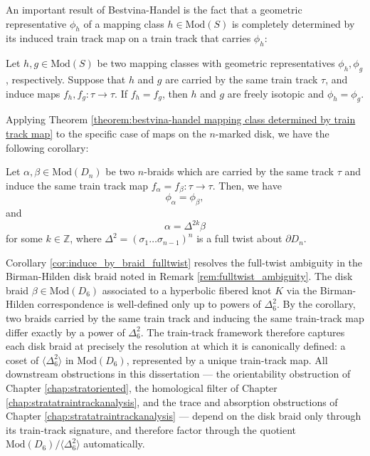 An important result of Bestvina-Handel is the fact that a geometric representative $\phi_h$ of a mapping class $h \in \mathrm{Mod}(S)$ is completely determined by its induced train track map on a train track that carries $\phi_h$:

\begin{theorem} \label{theorem:bestvina-handel mapping class determined by train track map}
Let $h, g \in \mathrm{Mod}(S)$ be two mapping classes with geometric representatives $\phi_h, \phi_g$, respectively. Suppose that $h$ and $g$ are carried by the same train track $\tau$, and induce maps $f_h, f_g \colon \tau \to \tau$. If $f_h = f_g$, then $h$ and $g$ are freely isotopic and $\phi_h = \phi_g$.
\end{theorem}

Applying Theorem \ref{theorem:bestvina-handel mapping class determined by train track map} to the specific case of maps on the $n$-marked disk, we have the following corollary:

\begin{corollary}\label{cor:induce_by_braid_fulltwist}
    Let $\alpha, \beta \in \mathrm{Mod}(D_n)$ be two $n$-braids which are carried by the same track $\tau$ and induce the same train track map $f_\alpha = f_\beta \colon \tau \to \tau$. Then, we have
    \[
    \phi_\alpha = \phi_\beta,
    \]
    and
    \[
    \alpha = \Delta^{2k} \beta
    \]
    for some $k \in \mathbb{Z}$, where $\Delta^2 = (\sigma_1 \dots \sigma_{n - 1})^n$ is a full twist about $\partial D_n$.
\end{corollary}

Corollary \ref{cor:induce_by_braid_fulltwist} resolves the full-twist ambiguity in the Birman-Hilden disk braid noted in Remark \ref{rem:fulltwist_ambiguity}. The disk braid $\beta \in \mathrm{Mod}(D_6)$ associated to a hyperbolic fibered knot $K$ via the Birman-Hilden correspondence is well-defined only up to powers of $\Delta_6^2$. By the corollary, two braids carried by the same train track and inducing the same train-track map differ exactly by a power of $\Delta_6^2$. The train-track framework therefore captures each disk braid at precisely the resolution at which it is canonically defined: a coset of $\langle \Delta_6^2 \rangle$ in $\mathrm{Mod}(D_6)$, represented by a unique train-track map. All downstream obstructions in this dissertation --- the orientability obstruction of Chapter \ref{chap:stratoriented}, the homological filter of Chapter \ref{chap:stratatraintrackanalysis}, and the trace and absorption obstructions of Chapter \ref{chap:stratatraintrackanalysis} --- depend on the disk braid only through its train-track signature, and therefore factor through the quotient $\mathrm{Mod}(D_6)/\langle \Delta_6^2 \rangle$ automatically.

